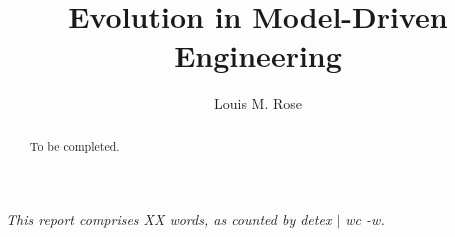 \documentclass[a4paper,10pt]{article}
\title{Evolution in Model-Driven Engineering}
\author{Louis M. Rose}
\begin{document}
\maketitle

\begin{abstract}
	To be completed.
\end{abstract}

\vspace{2mm}

\begin{center}
  \small{\textit{This report comprises XX words, as counted by detex $|$ wc -w.}}
\end{center}

\tableofcontents

\newpage







\end{document}
